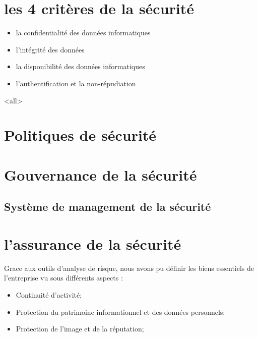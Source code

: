 


\section{les 4 critères de la sécurité}

\begin{itemize}
  \item la confidentialité des données informatiques
  \item l’intégrité des données
  \item la disponibilité des données informatiques
  \item l’authentification et la non-répudiation
\end{itemize}


\mode<all>{}



\section{Politiques de sécurité}

\utodo

\section{Gouvernance de la sécurité}

\utodo


\subsection{Système de management de la sécurité}

\utodo


\section{l'assurance de la sécurité}

Grace aux outils d’analyse de risque, nous avons pu définir les biens essentiels de l’entreprise vu sous différents aspects :
\begin{itemize}
\item Continuité d’activité;
\item Protection du patrimoine informationnel et des données personnels;
\item Protection de l’image et de la réputation;
\end{itemize}


